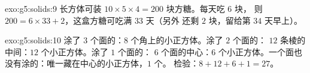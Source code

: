 \begin{solution}{exo:g5:solids:9}
长方体可装 $10 \times 5 \times 4 = 200$ 块方糖。每天吃 $6$ 块，
则 $200 = 6 \times 33 + 2$，这盒方糖可吃满 $33$ 天（另外
还剩 $2$ 块，留给第 $34$ 天早上）。
\end{solution}

\begin{solution}{exo:g5:solids:10}
涂了 $3$ 个面的：$8$ 个角上的小正方体。涂了 $2$ 个面的：
$12$ 条棱的中间：$12$ 个小正方体。涂了 $1$ 个面的：
$6$ 个面的中心：$6$ 个小正方体。一个面也没有涂的：唯一藏在中心的小正方体，$1$ 个。
检验：$8 + 12 + 6 + 1 = 27$。\checkmark
\end{solution}
